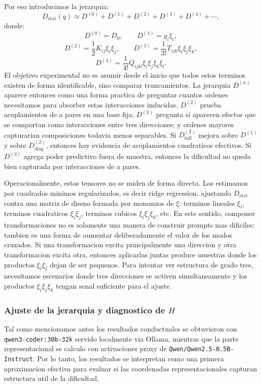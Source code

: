 \documentclass[10pt,twocolumn]{article}
\newcommand{\Dstat}{D_{\mathrm{stat}}}
\begin{document}
Por eso introducimos la jerarquia:
\[
D_{\mathrm{stat}}(q)
\approx
D^{(0)}+D^{(1)}+D^{(2)}+D^{(3)}+D^{(4)}+\cdots,
\]
donde:
\[
D^{(0)}=D_0,
\qquad
D^{(1)}=g_i\xi_i,
\]
\[
D^{(2)}=\frac{1}{2}K_{ij}\xi_i\xi_j,
\qquad
D^{(3)}=\frac{1}{3!}T_{ijk}\xi_i\xi_j\xi_k,
\]
\[
D^{(4)}=\frac{1}{4!}Q_{ijkl}\xi_i\xi_j\xi_k\xi_l.
\]
El objetivo experimental no es asumir desde el inicio que todos estos terminos existen de forma identificable, sino comparar truncamientos. La jerarquia \(D^{(n)}\) aparece entonces como una forma practica de preguntar cuantos ordenes necesitamos para absorber estas interacciones inducidas. \(D^{(2)}\) prueba acoplamientos de a pares en una base fija; \(D^{(3)}\) pregunta si aparecen efectos que se comportan como interacciones entre tres direcciones; y ordenes mayores capturarian composiciones todavia menos separables. Si \(D^{(2)}_{\mathrm{full}}\) mejora sobre \(D^{(1)}\) y sobre \(D^{(2)}_{\mathrm{diag}}\), entonces hay evidencia de acoplamientos cuadraticos efectivos. Si \(D^{(3)}\) agrega poder predictivo fuera de muestra, entonces la dificultad no queda bien capturada por interacciones de a pares.

Operacionalmente, estos tensores no se miden de forma directa. Los estimamos por cuadrados minimos regularizados, es decir ridge regression, ajustando \(\Dstat\) contra una matriz de diseno formada por monomios de \(\xi\): terminos lineales \(\xi_i\), terminos cuadraticos \(\xi_i\xi_j\), terminos cubicos \(\xi_i\xi_j\xi_k\), etc. En este sentido, componer transformaciones no es solamente una manera de construir prompts mas dificiles: tambien es una forma de aumentar deliberadamente el valor de los modos cruzados. Si una transformacion excita principalmente una direccion y otra transformacion excita otra, entonces aplicarlas juntas produce muestras donde los productos \(\xi_i\xi_j\) dejan de ser pequenos. Para intentar ver estructura de grado tres, necesitamos escenarios donde tres direcciones se activen simultaneamente y los productos \(\xi_i\xi_j\xi_k\) tengan senal suficiente para el ajuste.

\subsubsection*{Ajuste de la jerarquia y diagnostico de \texorpdfstring{\(H\)}{H}}

Tal como mencionamos antes los resultados conductuales se obtuvieron con \texttt{qwen3-coder:30b-32k} servido localmente via Ollama, mientras que la parte representacional se calculo con activaciones proxy de \texttt{Qwen/Qwen2.5-0.5B-Instruct}. Por lo tanto, los resultados se interpretan como una primera aproximacion efectiva para evaluar si las coordenadas representacionales capturan estructura util de la dificultad.
\end{document}
